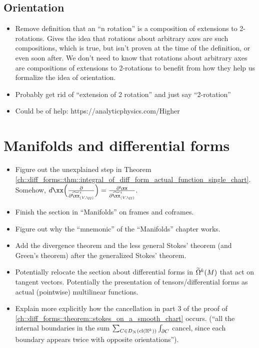 \subsection*{Orientation}

\begin{itemize}
    \item Remove definition that an “n rotation” is a composition of extensions to 2-rotations. Gives the idea that rotations about arbitrary axes are such compositions, which is true, but isn’t proven at the time of the definition, or even soon after. We don’t need to know that rotations about arbitrary axes are compositions of extensions to 2-rotations to benefit from how they help us formalize the idea of orientation.
    \item Probably get rid of “extension of 2 rotation” and just say “2-rotation”
    \item Could be of help: https://analyticphysics.com/Higher%
\end{itemize}

\section*{Manifolds and differential forms}

\begin{itemize}
    
    \item Figure out the unexplained step in Theorem \ref{ch::diff_forms::thm::integral_of_diff_form_actual_function_single_chart}. Somehow, $d\xx \Big( \frac{\pd}{\pd \tx^i_{(V, \yy)}} \Big) = \frac{\pd \xx}{\pd \tx^i_{(V, \yy)}}$. 
    \item Finish the section in ``Manifolds'' on frames and coframes.
    \item Figure out why the ``mnemonic'' of the ``Manifolds'' chapter works.
    \item Add the divergence theorem and the less general Stokes' theorem (and Green's theorem) after the generalized Stokes' theorem.
    \item Potentially relocate the section about differential forms in $\widetilde{\Omega}^k(M)$ that act on tangent vectors. Potentially the presentation of  tensors/differential forms as actual (pointwise) multilinear functions.
    \item Explain more explicitly how the cancellation in part 3 of the proof of \ref{ch::diff_forms::theorem::stokes_on_a_smooth_chart} occurs. (``all the internal boundaries in the sum $\sum_{C \in D_N(\text{cl}(\mathbb{H}^k))} \int_{\partial C}$ cancel, since each boundary appears twice with opposite orientations'').
\end{itemize}